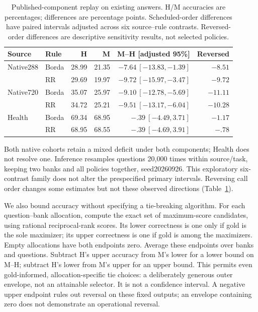 \begin{table}[t]
\centering\small
\caption{Published-component replay on existing answers. H/M accuracies are percentages; differences are percentage points. Scheduled-order differences have paired intervals adjusted across six source--rule contrasts. Reversed-order differences are descriptive sensitivity results, not selected policies.}
\label{tab:public_components}
\begin{tabular}{llrrrr}
\toprule
Source & Rule & H & M & M--H [adjusted 95\%] & Reversed\\
\midrule
Native288 & Borda &28.99&21.35&$-7.64\ [-13.83,-1.39]$&$-8.51$\\
& RR &29.69&19.97&$-9.72\ [-15.97,-3.47]$&$-9.72$\\
Native720 & Borda &35.07&25.97&$-9.10\ [-12.78,-5.69]$&$-11.11$\\
& RR &34.72&25.21&$-9.51\ [-13.17,-6.04]$&$-10.28$\\
Health & Borda &69.34&68.95&$-.39\ [-4.49,3.71]$&$-1.17$\\
& RR &68.95&68.55&$-.39\ [-4.69,3.91]$&$-.78$\\
\bottomrule
\end{tabular}
\end{table}

Both native cohorts retain a mixed deficit under both components; Health does not resolve one. Inference resamples questions 20,000 times within source/task, keeping two banks and all policies together, seed20260926. This exploratory six-contrast family does not alter the prespecified primary intervals. Reversing call order changes some estimates but not these observed directions (Table~\ref{tab:public_components}).

We also bound accuracy without specifying a tie-breaking algorithm. For each question--bank allocation, compute the exact set of maximum-score candidates, using rational reciprocal-rank scores. Its lower correctness is one only if gold is the sole maximizer; its upper correctness is one if gold is among the maximizers. Empty allocations have both endpoints zero. Average these endpoints over banks and questions. Subtract H's upper accuracy from M's lower for a lower bound on M--H; subtract H's lower from M's upper for an upper bound. This permits even gold-informed, allocation-specific tie choices: a deliberately generous outer envelope, not an attainable selector. It is not a confidence interval. A negative upper endpoint rules out reversal on these fixed outputs; an envelope containing zero does not demonstrate an operational reversal.

